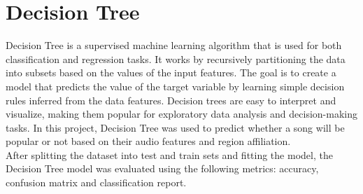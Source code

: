 \begin{itemize}
\end{itemize} 





\newpage

\section{Decision Tree}

Decision Tree is a supervised machine learning algorithm that is used for both classification and regression tasks. It works by recursively partitioning the data into subsets based on the values of the input features. The goal is to create a model that predicts the value of the target variable by learning simple decision rules inferred from the data features. Decision trees are easy to interpret and visualize, making them popular for exploratory data analysis and decision-making tasks. In this project, Decision Tree was used to predict whether a song will be popular or not based on their audio features and region affiliation. \\

After splitting the dataset into test and train sets and fitting the model, the Decision Tree model was evaluated using the following metrics: accuracy, confusion matrix and classification report.


